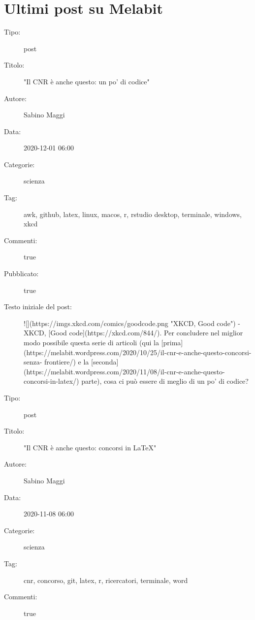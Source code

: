 \documentclass[11pt,oneside,a4paper]{report}
\begin{document}
\section*{Ultimi post su Melabit}

\begin{framed}
\begin{description}
    \item[Tipo:] post
    \item[Titolo:] "Il CNR è anche questo: un po' di codice"
    \item[Autore:] Sabino Maggi
    \item[Data:] 2020-12-01 06:00
    \item[Categorie:] scienza
    \item[Tag:] awk, github, latex, linux, macos, r, rstudio desktop, terminale, windows, xkcd
    \item[Commenti:] true
    \item[Pubblicato:] true
    \item[Testo iniziale del post:] 
    ![](https://imgs.xkcd.com/comics/goodcode.png "XKCD, Good code")
    - XKCD, [Good code](https://xkcd.com/844/).
    Per concludere nel miglior modo possibile questa serie di articoli (qui la
    [prima](https://melabit.wordpress.com/2020/10/25/il-cnr-e-anche-questo-concorsi-senza-
    frontiere/) e la [seconda](https://melabit.wordpress.com/2020/11/08/il-cnr-e-anche-questo-
    concorsi-in-latex/) parte), cosa ci può essere di meglio di un po' di codice?
\end{description}
\end{framed}

\begin{framed}
\begin{description}
    \item[Tipo:] post
    \item[Titolo:] "Il CNR è anche questo: concorsi in LaTeX"
    \item[Autore:] Sabino Maggi
    \item[Data:] 2020-11-08 06:00
    \item[Categorie:] scienza
    \item[Tag:] cnr, concorso, git, latex, r, ricercatori, terminale, word
    \item[Commenti:] true
\end{description}
\end{framed}
\end{document}
